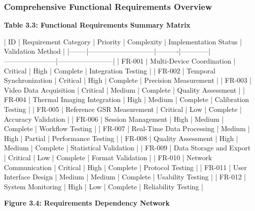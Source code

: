 \documentclass[11pt,a4paper]{report}
\begin{document}
\subsubsection{Comprehensive Functional Requirements Overview}

\textbf{Table 3.3: Functional Requirements Summary Matrix}

| ID     | Requirement Category        | Priority | Complexity | Implementation Status | Validation Method      |
|--------|-----------------------------|----------|------------|-----------------------|------------------------|
| FR-001 | Multi-Device Coordination   | Critical | High       | Complete              | Integration Testing    |
| FR-002 | Temporal Synchronization    | Critical | High       | Complete              | Precision Measurement  |
| FR-003 | Video Data Acquisition      | Critical | Medium     | Complete              | Quality Assessment     |
| FR-004 | Thermal Imaging Integration | High     | Medium     | Complete              | Calibration Testing    |
| FR-005 | Reference GSR Measurement   | Critical | Low        | Complete              | Accuracy Validation    |
| FR-006 | Session Management          | High     | Medium     | Complete              | Workflow Testing       |
| FR-007 | Real-Time Data Processing   | Medium   | High       | Partial               | Performance Testing    |
| FR-008 | Quality Assessment          | High     | Medium     | Complete              | Statistical Validation |
| FR-009 | Data Storage and Export     | Critical | Low        | Complete              | Format Validation      |
| FR-010 | Network Communication       | Critical | High       | Complete              | Protocol Testing       |
| FR-011 | User Interface Design       | Medium   | Medium     | Complete              | Usability Testing      |
| FR-012 | System Monitoring           | High     | Low        | Complete              | Reliability Testing    |

\textbf{Figure 3.4: Requirements Dependency Network}
\end{document}
